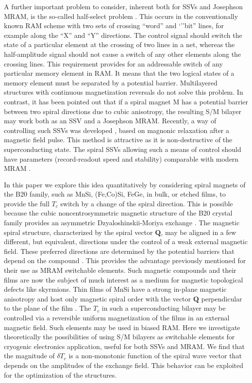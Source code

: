 \documentclass[prb,amsmath,amssymb,reprint]{revtex4-2}
\begin{document}
A further important problem to consider, inherent both for SSVs
and Josephson MRAM, is the so-called half-select problem \cite{Vernik2013}.
This occurs in the conventionally known RAM scheme with two sets of crossing ``word'' and `''bit'' lines, for example along the ``X'' and ``Y'' directions. The control signal should switch the state of a particular element at the crossing of two lines in
a net, whereas the half-amplitude signal should not cause a switch of any other elements along the crossing lines.
This requirement provides for an addressable switch of any particular memory element in RAM. It means that the two logical states of a memory element must be separated by a potential barrier.
Multilayered structures with continuous magnetization reversals do not solve
this problem. In contrast, it has been pointed out \cite{Pugach2017} that if a spiral magnet M has a potential barrier between two spiral directions due to cubic anisotropy, the resulting S/M bilayer  may work
both as an SSV and a Josephson MRAM. Recently, a way of controlling  such SSVs was developed \cite{Gusev2021},  based on magnonic relaxation after a  magnetic field pulse. This method  is attractive as it is non-destructive of the superconducting state. The spiral SSVs allowing such a means of control should have parameters (record-readout speed and stability) comparable with modern MRAM \cite{Gusev2021}.

In this paper we explore this idea  quantitatively \cite{Pugach2017} by considering spiral magnets of the B20 family, such as  MnSi, (Fe,Co)Si, FeGe, in bulk, or etched films, to provide the full $T_{c}$ switch by a change of the spiral direction. This is possible because  the cubic noncentrosymmetric magnetic structure of the B20 crystal family \cite{Ishikawa1977,Pfleiderer2001,Uchida2006}
 provides an asymmetric Dzyaloshinskii-Moriya exchange \cite{Dyadkin2}.
 The magnetic spiral structure, characterized by the spiral vector $\mathbf{Q}$, may be aligned in a few different, but equivalent, directions under the control of a weak external magnetic
field. These preferred directions are determined by the potential barriers that
depend on the compound \cite{Dyadkin}.
This provides the  advantage previously mentioned  for their use as MRAM
switchable elements. Such magnetic compounds and their films are now the subject of much interest \cite%
{Muhlbauer2009,Fert2013} as a medium for magnetic topological defects like
skyrmions. Thin films of MnSi have a strong in-plane magnetic anisotropy and
host only magnetic spiral order with the vector $\mathbf{Q}$ perpendicular to the plane of the film \cite{Menzel}.
The $T_{c}$ in such a superconducting bilayer  may be controlled via  a reversible uniform magnetization of the films in an external magnetic field. Such elements may be used in biased RAM. Here we  investigate theoretically the  possibilities of using S/M bilayers as switchable elements for cryogenic electronics application, useful for both SSVs and MRAM. We find that the magnitude of $\delta T_c$ is a non-monotonic function of the spiral wave vector  that depends on the amplitudes of the exchange field. This behavior can be exploited for the optimization of the structures.
\end{document}
